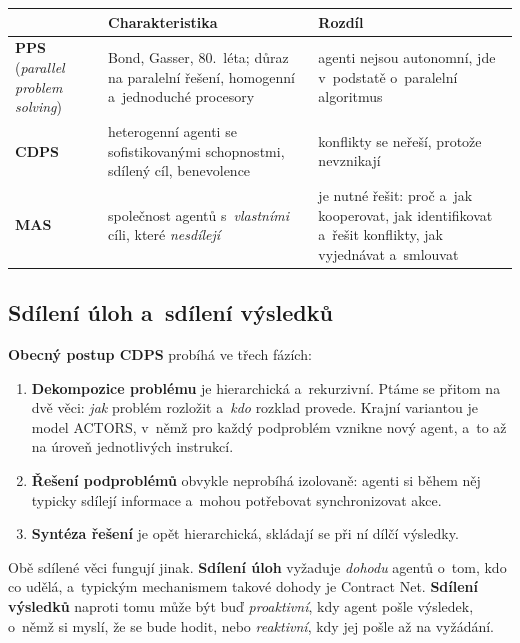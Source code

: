 \documentclass[11pt,a4paper]{article}
\theoremstyle{definition}
\begin{document}
\begin{center}\small
\begin{tabular}{p{} p{} p{}}
\toprule
& \textbf{Charakteristika} & \textbf{Rozdíl} \\
\midrule
\textbf{PPS} \newline (\emph{parallel problem solving})
  & Bond, Gasser, 80.~léta; důraz na paralelní řešení, homogenní a~jednoduché procesory
  & agenti nejsou autonomní, jde v~podstatě o~paralelní algoritmus \\
\textbf{CDPS}
  & heterogenní agenti se sofistikovanými schopnostmi, sdílený cíl, benevolence
  & konflikty se neřeší, protože nevznikají \\
\textbf{MAS}
  & společnost agentů s~\emph{vlastními} cíli, které \emph{nesdílejí}
  & je nutné řešit: proč a~jak kooperovat, jak identifikovat a~řešit konflikty, jak
    vyjednávat a~smlouvat \\
\bottomrule
\end{tabular}
\end{center}

\subsection{Sdílení úloh a~sdílení výsledků}

\textbf{Obecný postup CDPS} probíhá ve třech fázích:
\begin{enumerate}
\item \textbf{Dekompozice problému} je hierarchická a~rekurzivní. Ptáme se přitom na dvě věci:
  \emph{jak} problém rozložit a~\emph{kdo} rozklad provede. Krajní variantou je model ACTORS,
  v~němž pro každý podproblém vznikne nový agent, a~to až na úroveň jednotlivých instrukcí.
\item \textbf{Řešení podproblémů} obvykle neprobíhá izolovaně: agenti si během něj typicky
  sdílejí informace a~mohou potřebovat synchronizovat akce.
\item \textbf{Syntéza řešení} je opět hierarchická, skládají se při ní dílčí výsledky.
\end{enumerate}

Obě sdílené věci fungují jinak. \textbf{Sdílení úloh} vyžaduje \emph{dohodu} agentů o~tom, kdo
co udělá, a~typickým mechanismem takové dohody je Contract Net. \textbf{Sdílení výsledků}
naproti tomu může být buď \emph{proaktivní}, kdy agent pošle výsledek, o~němž si myslí, že se
bude hodit, nebo \emph{reaktivní}, kdy jej pošle až na vyžádání.
\end{document}
